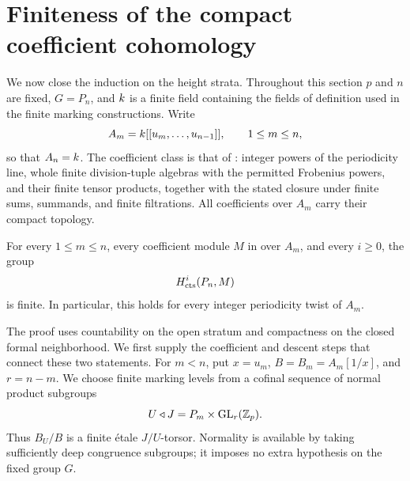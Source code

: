 \section{Finiteness of the compact coefficient cohomology}
\label{sec:coefficients}

We now close the induction on the height strata.  Throughout this section
$p$ and $n$ are fixed, $G=P_n$, and $k$ is a finite field containing the
fields of definition used in the finite marking constructions.  Write
\[
 A_m=k[[u_m,\ldots,u_{n-1}]],\qquad 1\leq m\leq n,
\]
so that $A_n=k$.  The coefficient class is that of
: integer powers of the periodicity line,
whole finite division-tuple algebras with the permitted Frobenius powers,
and their finite tensor products, together with the stated closure under
finite sums, summands, and finite filtrations.  All coefficients over
$A_m$ carry their compact topology.

\begin{theorem}\label{thm:coeff-finite}
For every $1\leq m\leq n$, every coefficient module $M$ in
 over $A_m$, and every $i\geq0$, the group
\[
 H^i_{\mathrm{cts}}(P_n,M)
\]
is finite.  In particular, this holds for every integer periodicity twist
of $A_m$.
\end{theorem}

The proof uses countability on the open stratum and compactness on the
closed formal neighborhood.  We first supply the coefficient and descent
steps that connect these two statements.  For $m<n$, put
$x=u_m$, $B=B_m=A_m[1/x]$, and $r=n-m$.  We choose finite marking levels
from a cofinal sequence of normal product subgroups
\[
 U\triangleleft J=P_m\times\operatorname{GL}_r(\mathbb Z_p).
\]
Thus $B_U/B$ is a finite \'etale $J/U$-torsor.  Normality is available by
taking sufficiently deep congruence subgroups; it imposes no extra
hypothesis on the fixed group $G$.


